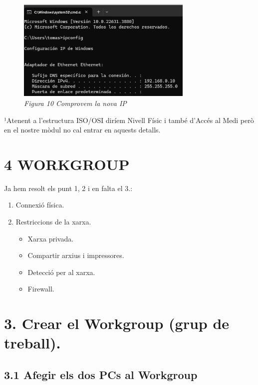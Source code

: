 \documentclass[
  a4paper,
]{article}
\providecommand{\tightlist}{%
  \setlength{\itemsep}{0pt}\setlength{\parskip}{0pt}}
\begin{document}
\begin{figure}
\centering
\includegraphics[width=0.75\textwidth,height=\textheight]{png/ipconfig.png}
\caption{\emph{Figura 10 Comprovem la nova IP}}
\end{figure}

¹Atenent a l'estructura ISO/OSI diríem Nivell Físic i també d'Accés al
Medi però en el nostre mòdul no cal entrar en aquests detalls.

\section{4 WORKGROUP}\label{workgroup}

Ja hem resolt els punt 1, 2 i en falta el 3.:

\begin{enumerate}
\def\labelenumi{\arabic{enumi}.}
\tightlist
\item
  Connexió física.
\item
  Restriccions de la xarxa.

  \begin{itemize}
  \tightlist
  \item
    Xarxa privada.
  \item
    Compartir arxius i impressores.
  \item
    Detecció per al xarxa.
  \item
    Firewall.
  \end{itemize}
\end{enumerate}

\section{3. Crear el Workgroup (grup de
treball).}\label{crear-el-workgroup-grup-de-treball.}

\subsection{3.1 Afegir els dos PCs al
Workgroup}\label{afegir-els-dos-pcs-al-workgroup}
\end{document}
